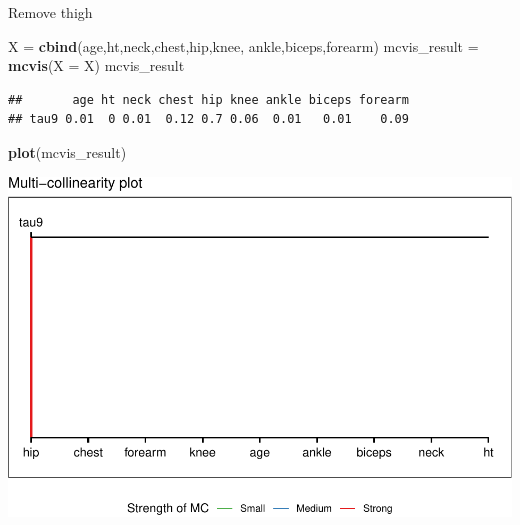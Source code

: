 \documentclass[]{article}
\newenvironment{Shaded}{\begin{snugshade}}{\end{snugshade}}
\newcommand{\KeywordTok}[1]{\textcolor[rgb]{0.13,0.29,0.53}{\textbf{#1}}}
\newcommand{\DataTypeTok}[1]{\textcolor[rgb]{0.13,0.29,0.53}{#1}}
\newcommand{\StringTok}[1]{\textcolor[rgb]{0.31,0.60,0.02}{#1}}
\newcommand{\NormalTok}[1]{#1}
\begin{document}
Remove thigh

\begin{Shaded}
\begin{Highlighting}[]
\NormalTok{X =}\StringTok{ }\KeywordTok{cbind}\NormalTok{(age,ht,neck,chest,hip,knee,}
\NormalTok{         ankle,biceps,forearm)}
\NormalTok{mcvis_result =}\StringTok{ }\KeywordTok{mcvis}\NormalTok{(}\DataTypeTok{X =}\NormalTok{ X)}
\NormalTok{mcvis_result}
\end{Highlighting}
\end{Shaded}

\begin{verbatim}
##       age ht neck chest hip knee ankle biceps forearm
## tau9 0.01  0 0.01  0.12 0.7 0.06  0.01   0.01    0.09
\end{verbatim}

\begin{Shaded}
\begin{Highlighting}[]
\KeywordTok{plot}\NormalTok{(mcvis_result)}
\end{Highlighting}
\end{Shaded}

\includegraphics{BodyFat_files/figure-latex/unnamed-chunk-51-1.pdf}
\end{document}
